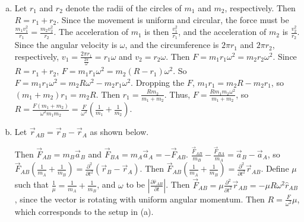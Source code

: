 \documentclass{esg8012pset}
\begin{document}
\begin{solution}
  \begin{enumerate}[a)]
    \item Let $r_1$ and $r_2$ denote the radii of the circles of $m_1$ and $m_2$, respectively.  Then $R = r_1 + r_2$.  Since the movement is uniform and circular, the force must be $\frac{m_1 v_1^2}{r_1} = \frac{m_2 v_2^2}{r_2}$.  The acceleration of $m_1$ is then $\frac{v_1^2}{r_1}$, and the acceleration of $m_2$ is $\frac{v_2^2}{r_2}$.  Since the angular velocity is $\omega$, and the circumference is $2\pi r_1$ and $2\pi r_2$, respectively, $v_1 = \frac{2\pi r_1}{\frac{2\pi}{\omega}} = r_1 \omega$ and $v_2 = r_2 \omega$.  Then $F = m_1 r_1 \omega^2 =  m_2 r_2 \omega^2$.  Since $R = r_1 + r_2$, $F = m_1 r_1 \omega^2 = m_2 (R - r_1) \omega^2$.  So $F = m_1 r_1 \omega^2 = m_2 R \omega^2 - m_2 r_1 \omega^2$.  Dropping the $F$, $m_1 r_1 = m_2 R - m_2 r_1$, so $(m_1 + m_2)r_1 = m_2 R$.  Then $r_1 = \frac{R m_2}{m_1 + m_2}$.  Thus, $F =  \frac{R m_1 m_2\omega^2}{m_1 + m_2}$, so $R = \frac{F(m_1+m_2)}{\omega^2 m_1 m_2} = \frac{F}{\omega^2}\left(\frac{1}{m_1}+\frac{1}{m_2}\right)$.
    \item Let $\vec r_{AB} = \vec r_B - \vec r_A$ as shown below.
      \begin{center}
      \end{center}
      Then $\vec F_{AB} = m_B \vec a_B$ and $\vec F_{BA} = m_A \vec a_A = -\vec F_{AB}$.  $\frac{\vec F_{AB}}{m_B} - \frac{\vec F_{BA}}{m_A} = \vec a_B - \vec a_A$, so $\vec F_{AB}\left(\frac{1}{m_A} + \frac{1}{m_B}\right) = \frac{\partial^2}{\partial t^2}(\vec r_B - \vec r_A)$.  Then $\vec F_{AB}\left(\frac{1}{m_A} + \frac{1}{m_B}\right) = \frac{\partial^2}{\partial t^2}\vec r_{AB}$.  Define $\mu$ such that $\frac{1}{\mu} = \frac{1}{m_A} + \frac{1}{m_B}$, and $\omega$ to be $\left\vert \frac{\partial \hat r_{AB}}{\partial t}\right\vert$.  Then $\vec F_{AB} = \mu \frac{\partial^2}{\partial t^2}\vec r_{AB} = -\mu R\omega^2\hat r_{AB}$, since the vector is rotating with uniform angular momentum.  Then $R = \frac{F}{\omega^2}\mu$, which corresponds to the setup in (a).
  \end{enumerate}
  

\end{solution}
\end{document}
